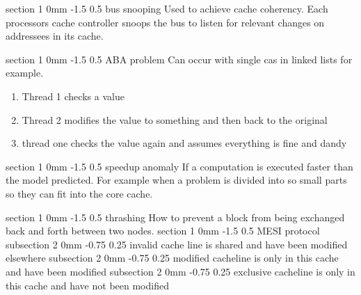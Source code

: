 \documentclass[a4paper,11pt]{article}
\makeatletter
\renewcommand{\section}{\@startsection
   {section}%
   {1}%
   {0mm}%
   {-1.5\baselineskip}%
   {0.5\baselineskip}%
   {\sffamily\bfseries\upshape\normalsize}}%
\renewcommand{\subsection}{\@startsection
   {subsection}%
   {2}%
   {0mm}%
   {-0.75\baselineskip}%
   {0.25\baselineskip}%
   {\rmfamily\normalfont\slshape\normalsize}}%
\makeatother
\begin{document}
\section{bus snooping}
Used to achieve cache coherency. Each processors cache controller snoops the bus to listen for relevant changes on addressees in its cache.

\section{ABA problem}
Can occur with single cas in linked lists for example.
\begin{enumerate}
\item Thread 1 checks a value
\item Thread 2 modifies the value to something and then back to the original
\item thread one checks the value again and assumes everything is fine and dandy
\end{enumerate}

\section{speedup anomaly}
If a computation is executed faster than the model predicted. For example when a problem is divided into so small parts so they can fit into the core cache. 

\section{thrashing}
How to prevent a block from being exchanged back and forth between two nodes.
\section{MESI protocol}
\subsection{invalid}
cache line is shared and have been modified elsewhere
\subsection{modified}
cacheline is only in this cache and have been modified
\subsection{exclusive}
cacheline is only in this cache and have not been modified
\end{document}
